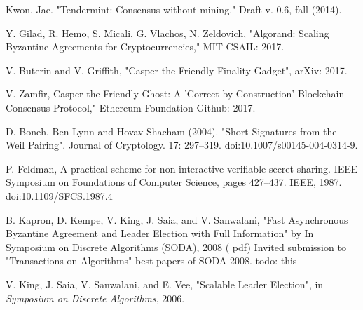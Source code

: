 \documentclass[10pt,journal,compsoc]{IEEEtran}
\begin{document}
\begin{thebibliography}{1}
 Kwon, Jae. "Tendermint: Consensus without mining." Draft v. 0.6, fall (2014).

Y. Gilad, R. Hemo, S. Micali, G. Vlachos, N. Zeldovich, "Algorand: Scaling Byzantine Agreements for Cryptocurrencies," MIT CSAIL: 2017.

V. Buterin and V. Griffith, "Casper the Friendly Finality Gadget", arXiv: 2017.

 V. Zamfir, Casper the Friendly Ghost: A 'Correct by Construction' Blockchain Consensus Protocol," Ethereum Foundation Github: 2017.

 D. Boneh, Ben Lynn and Hovav Shacham (2004). "Short Signatures from the Weil Pairing". Journal of Cryptology. 17: 297–319. doi:10.1007/s00145-004-0314-9.

 P. Feldman, A practical scheme for non-interactive verifiable secret sharing. IEEE Symposium on Foundations of Computer Science, pages 427--437. IEEE, 1987. doi:10.1109/SFCS.1987.4

B. Kapron, D. Kempe, V. King, J. Saia, and V. Sanwalani, "Fast Asynchronous Byzantine Agreement and Leader Election with Full Information" by In Symposium on Discrete Algorithms (SODA), 2008 ( pdf) Invited submission to "Transactions on Algorithms" best papers of SODA 2008. todo: this

V. King, J. Saia, V. Sanwalani, and E. Vee, "Scalable Leader Election", in \emph{Symposium on Discrete Algorithms}, 2006.

\end{thebibliography}

% 










\end{document}
